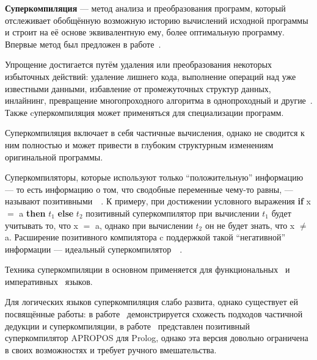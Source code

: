 {\bf Суперкомпиляция} --- метод анализа и преобразования программ,
который отслеживает обобщённую возможную историю вычислений исходной
программы и строит на её основе эквивалентную ему, более оптимальную программу.
Впервые метод был предложен в работе~\cite{turchinSC}.

Упрощение достигается путём удаления или преобразования
некоторых избыточных действий: удаление лишнего кода, выполнение
операций над уже известными данными, избавление от промежуточных
структур данных, инлайнинг, превращение многопроходного алгоритма
в однопроходный и другие~\cite{scompRevisited}.
Также cуперкомпиляция может применяться для специализации программ.


Суперкомпиляция включает в себя частичные вычисления, однако не
сводится к ним полностью и может привести в глубоким структурным
изменениям оригинальной программы.

Суперкомпиляторы, которые используют только ``положительную''
информацию --- то есть информацию о том, что сводобные переменные
чему-то равны, --- называют
позитивными~~\cite{scPos}.
К примеру, при достижении условного выражения
{\bf if} x $=$ a {\bf then} $t_1$ {\bf else} $t_2$
позитивный суперкомпилятор при вычислении $t_1$ будет учитывать то,
что x $=$ a, однако при вычислении $t_2$ он не будет знать, что
x $\neq$ a.
Расширение позитивного компилятора c поддержкой такой ``негативной''
информации --- идеальный
суперкомпилятор~~\cite{scPerf}.

Техника суперкомпиляции в основном применяется для
функциональных~\cite{scHaskell, scPos} и императивных~\cite{scJava}
языков.

Для логических языков суперкомпиляция слабо развита, однако существует
ей посвящённые работы:
в работе~\cite{pdAndDriving} демонстрируется схожесть подходов частичной дедукции
и суперкомпиляции,
в работе~\cite{apropos} представлен позитивный суперкомпилятор APROPOS
для Prolog, однако эта версия довольно ограничена в своих возможностях
и требует ручного вмешательства.




